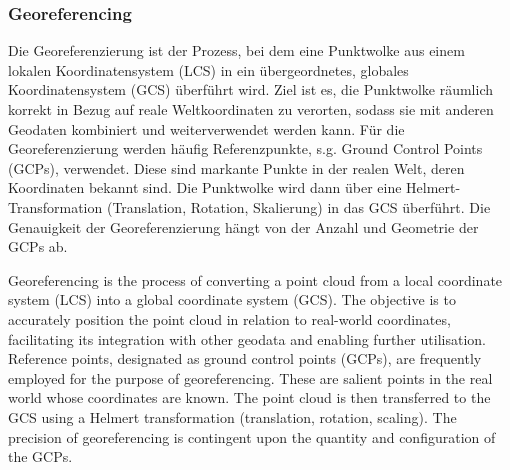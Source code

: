 \subsubsection{Georeferencing}
\begin{German}
    Die Georeferenzierung ist der Prozess, bei dem eine Punktwolke aus einem lokalen Koordinatensystem (LCS) in ein übergeordnetes, globales Koordinatensystem (GCS) überführt wird. Ziel ist es, die Punktwolke räumlich korrekt in Bezug auf reale Weltkoordinaten zu verorten, sodass sie mit anderen Geodaten kombiniert und weiterverwendet werden kann. Für die Georeferenzierung werden häufig Referenzpunkte, s.g. Ground Control Points (GCPs), verwendet. Diese sind markante Punkte in der realen Welt, deren Koordinaten bekannt sind. Die Punktwolke wird dann über eine Helmert-Transformation (Translation, Rotation, Skalierung) in das GCS überführt. Die Genauigkeit der Georeferenzierung hängt von der Anzahl und Geometrie der GCPs ab. \cite{voordendagKursGeodaetischeMesstechnik}
\end{German}

\begin{English}
    Georeferencing is the process of converting a point cloud from a local coordinate system (LCS) into a global coordinate system (GCS). The objective is to accurately position the point cloud in relation to real-world coordinates, facilitating its integration with other geodata and enabling further utilisation. Reference points, designated as ground control points (GCPs), are frequently employed for the purpose of georeferencing. These are salient points in the real world whose coordinates are known. The point cloud is then transferred to the GCS using a Helmert transformation (translation, rotation, scaling). The precision of georeferencing is contingent upon the quantity and configuration of the GCPs. \cite{voordendagKursGeodaetischeMesstechnik}
\end{English}

